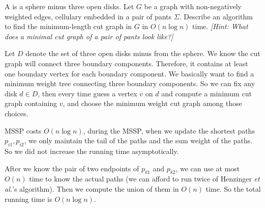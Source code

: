 \documentclass[11pt]{article}
\begin{document}
  A  is a sphere minus three open disks.
  Let \(G\) be a graph with non-negatively weighted edges, cellulary embedded in a pair of pants
  \(\Sigma\).
  Describe an algorithm to find the minimum-length cut graph in \(G\) in \(O(n \log n)\) time.
  \emph{[Hint: What does a minimal cut graph of a pair of pants look like?]}
  \begin{solution}
    Let \(D\) denote the set of three open disks minus from the sphere.
    We know the cut graph will connect three boundary components. Therefore, it contains at least one boundary vertex for each boundary component. We basically want to find a minimum weight tree connecting three boundary components. So we can fix any disk \(d\in D\), then every time guess a vertex \(v\) on \(d\) and compute a minimum cut graph containing \(v\), and choose the minimum weight cut graph among those choices.
MSSP costs \(O(n\log{n})\), during the MSSP, when we update the shortest paths \(p_{i1},p_{i2}\), we only maintain the tail of the paths and the sum weight of the paths. So we did not increase the running time asymptotically.

After we know the pair of two endpoints of \(p_{k1}\) and \(p_{k2}\), we can use at most \(O(n)\) time to know the actual paths (we can afford to run twice of Henzinger \textit{et al.}'s algorithm). Then we compute the union of them in \(O(n)\) time. So the total running time is \(O(n\log{n})\).

\end{solution}
\end{document}
